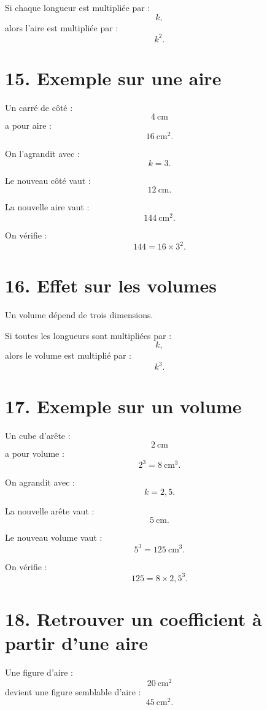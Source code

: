 Si chaque longueur est multipliée par :
\[
k,
\]
alors l'aire est multipliée par :
\[
\boxed{k^2}.
\]


\section{15. Exemple sur une aire}

Un carré de côté :
\[
4\ \text{cm}
\]
a pour aire :
\[
16\ \text{cm}^2.
\]

On l'agrandit avec :
\[
k=3.
\]

Le nouveau côté vaut :
\[
12\ \text{cm}.
\]

La nouvelle aire vaut :
\[
144\ \text{cm}^2.
\]

On vérifie :
\[
144=16\times3^2.
\]

\section{16. Effet sur les volumes}

Un volume dépend de trois dimensions.

Si toutes les longueurs sont multipliées par :
\[
k,
\]
alors le volume est multiplié par :
\[
\boxed{k^3}.
\]

\section{17. Exemple sur un volume}

Un cube d'arête :
\[
2\ \text{cm}
\]
a pour volume :
\[
2^3=8\ \text{cm}^3.
\]

On agrandit avec :
\[
k=2{,}5.
\]

La nouvelle arête vaut :
\[
5\ \text{cm}.
\]

Le nouveau volume vaut :
\[
5^3=125\ \text{cm}^3.
\]

On vérifie :
\[
125=8\times2{,}5^3.
\]

\section{18. Retrouver un coefficient à partir d'une aire}

Une figure d'aire :
\[
20\ \text{cm}^2
\]
devient une figure semblable d'aire :
\[
45\ \text{cm}^2.
\]


